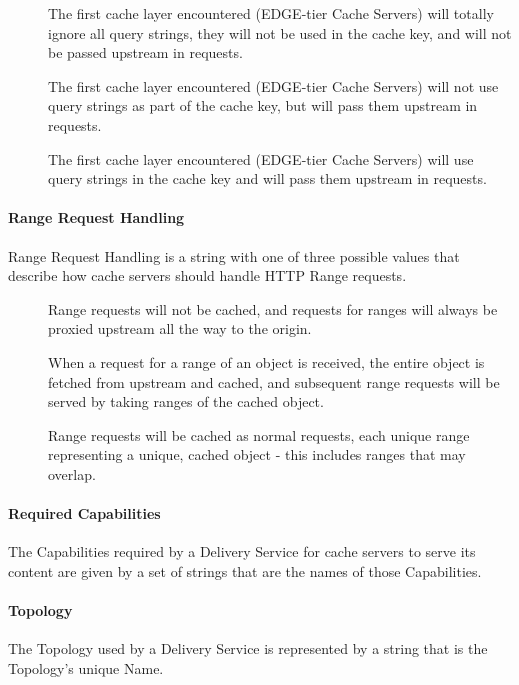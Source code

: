 \begin{description}
	\item[] The first cache layer encountered (EDGE-tier Cache
	Servers) will totally ignore all query strings, they will not be used in the
	cache key, and will not be passed upstream in requests.
	\item[] The first cache layer encountered (EDGE-tier Cache
	Servers) will not use query strings as part of the cache key, but will pass
	them upstream in requests.
	\item[] The first cache layer encountered (EDGE-tier Cache
	Servers) will use query strings in the cache key and will pass them upstream
	in requests.
\end{description}

\paragraph{Range Request Handling}
Range Request Handling is a string with one of three possible values that
describe how cache servers should handle HTTP Range requests.

\begin{description}
	\item[] Range requests will not be cached, and requests for
	ranges will always be proxied upstream all the way to the origin.
	\item[] When a request for a range of an object is
	received, the entire object is fetched from upstream and cached, and
	subsequent range requests will be served by taking ranges of the cached
	object.
	\item[] Range requests will be cached as normal requests, each
	unique range representing a unique, cached object - this includes ranges
	that may overlap.
\end{description}

\paragraph{Required Capabilities}
The Capabilities required by a Delivery Service for cache servers to serve its
content are given by a set of strings that are the names of those Capabilities.

\paragraph{Topology}
The Topology used by a Delivery Service is represented by a string that is the
Topology's unique Name.

